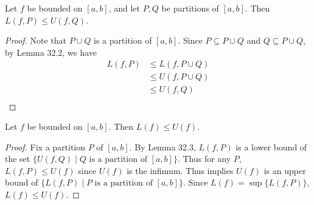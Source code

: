 \documentclass{article}
\begin{document}
\begin{clemma}[Lemma 32.3]
  Let $f$ be bounded on $[a, b]$, and let $P, Q$ be partitions of $[a, b]$. Then $L(f, P) \leq U(f, Q)$.
\end{clemma}
\begin{proof}
  Note that $P \cup Q$ is a partition of $[a, b]$. Since $P \subseteq P \cup Q$ and $Q \subseteq P \cup Q$, by Lemma 32.2, we have
  \begin{align*}
    L(f, P) &\leq L(f, P \cup Q)\\
    & \leq U(f, P \cup Q)\\
    &\leq U(f, Q)\\
  \end{align*}
\end{proof}
\begin{cthm}[Theorem 32.4]
  Let $f$ be bounded on $[a, b]$. Then $L(f) \leq U(f)$.
\end{cthm}
\begin{proof}
  Fix a partition $P$ of $[a, b]$. By Lemma 32.3, $L(f, P)$ is a lower bound of the set $\{U(f, Q) \mid Q \text{ is a partition of } [a, b]\}$. Thus for any $P$, $L(f, P) \leq U(f)$ since $U(f)$ is the infimum. Thus implies $U(f)$ is an upper bound of $\{L(f, P) \mid P \text{ is a partition of } [a, b]\}$. Since $L(f) = \sup\{L(f, P)\}$, $L(f) \leq U(f)$.
\end{proof}
\end{document}
